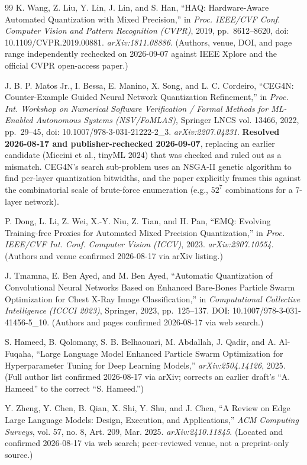 \documentclass[journal]{IEEEtran}
\begin{document}
\begin{thebibliography}{99}
 K. Wang, Z. Liu, Y. Lin, J. Lin, and S. Han, ``HAQ: Hardware-Aware Automated Quantization with Mixed Precision,'' in \emph{Proc. IEEE/CVF Conf. Computer Vision and Pattern Recognition (CVPR)}, 2019, pp.~8612--8620, doi: 10.1109/CVPR.2019.00881. \emph{arXiv:1811.08886}. (Authors, venue, DOI, and page range independently rechecked on 2026-09-07 against IEEE Xplore and the official CVPR open-access paper.)

 J. B. P. Matos Jr., I. Bessa, E. Manino, X. Song, and L. C. Cordeiro, ``CEG4N: Counter-Example Guided Neural Network Quantization Refinement,'' in \emph{Proc. Int. Workshop on Numerical Software Verification / Formal Methods for ML-Enabled Autonomous Systems (NSV/FoMLAS)}, Springer LNCS vol. 13466, 2022, pp.~29--45, doi: 10.1007/978-3-031-21222-2\_3. \emph{arXiv:2207.04231}. \textbf{Resolved 2026-08-17 and publisher-rechecked 2026-09-07}, replacing an earlier candidate (Miccini et al., tinyML 2024) that was checked and ruled out as a mismatch. CEG4N's search sub-problem uses an NSGA-II genetic algorithm to find per-layer quantization bitwidths, and the paper explicitly frames this against the combinatorial scale of brute-force enumeration (e.g., $52^7$ combinations for a 7-layer network).

 P. Dong, L. Li, Z. Wei, X.-Y. Niu, Z. Tian, and H. Pan, ``EMQ: Evolving Training-free Proxies for Automated Mixed Precision Quantization,'' in \emph{Proc. IEEE/CVF Int. Conf. Computer Vision (ICCV)}, 2023. \emph{arXiv:2307.10554}. (Authors and venue confirmed 2026-08-17 via arXiv listing.)

 J. Tmamna, E. Ben Ayed, and M. Ben Ayed, ``Automatic Quantization of Convolutional Neural Networks Based on Enhanced Bare-Bones Particle Swarm Optimization for Chest X-Ray Image Classification,'' in \emph{Computational Collective Intelligence (ICCCI 2023)}, Springer, 2023, pp.~125--137. DOI: 10.1007/978-3-031-41456-5\_10. (Authors and pages confirmed 2026-08-17 via web search.)

 S. Hameed, B. Qolomany, S. B. Belhaouari, M. Abdallah, J. Qadir, and A. Al-Fuqaha, ``Large Language Model Enhanced Particle Swarm Optimization for Hyperparameter Tuning for Deep Learning Models,'' \emph{arXiv:2504.14126}, 2025. (Full author list confirmed 2026-08-17 via arXiv; corrects an earlier draft's ``A. Hameed'' to the correct ``S. Hameed.'')

 Y. Zheng, Y. Chen, B. Qian, X. Shi, Y. Shu, and J. Chen, ``A Review on Edge Large Language Models: Design, Execution, and Applications,'' \emph{ACM Computing Surveys}, vol. 57, no. 8, Art. 209, Mar. 2025. \emph{arXiv:2410.11845}. (Located and confirmed 2026-08-17 via web search; peer-reviewed venue, not a preprint-only source.)


\end{thebibliography}
\end{document}

